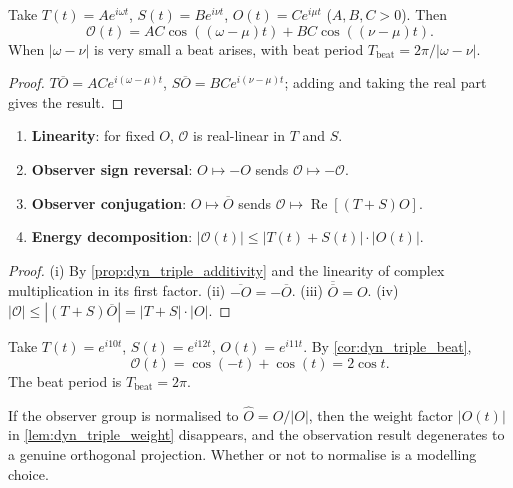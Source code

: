 \begin{corollary}\label{cor:dyn_triple_beat}
Take $T(t)=A e^{i\omega t}$, $S(t)=B e^{i\nu t}$, $O(t)=C e^{i\mu t}$ ($A,B,C>0$). Then
\[
\mathcal O(t)=AC\cos((\omega-\mu)t)+BC\cos((\nu-\mu)t).
\]
When $|\omega-\nu|$ is very small a beat arises, with beat period $T_{\text{beat}}=2\pi/|\omega-\nu|$.
\end{corollary}

\begin{proof}
$T\overline O=AC e^{i(\omega-\mu)t}$, $S\overline O=BC e^{i(\nu-\mu)t}$; adding and taking the real part gives the result.
\end{proof}

\begin{property}\label{prop:dyn_triple_properties}
\begin{enumerate}[label=(\roman*)]
    \item \textbf{Linearity}: for fixed $O$, $\mathcal O$ is real-linear in $T$ and $S$.
    \item \textbf{Observer sign reversal}: $O\mapsto-O$ sends $\mathcal O\mapsto-\mathcal O$.
    \item \textbf{Observer conjugation}: $O\mapsto\overline O$ sends $\mathcal O\mapsto\operatorname{Re}[(T+S)O]$.
    \item \textbf{Energy decomposition}: $|\mathcal O(t)|\le|T(t)+S(t)|\cdot|O(t)|$.
\end{enumerate}
\end{property}

\begin{proof}
(i) By \cref{prop:dyn_triple_additivity} and the linearity of complex multiplication in its first factor. (ii) $\overline{-O}=-\overline O$. (iii) $\overline{\overline O}=O$. (iv) $|\mathcal O|\le|(T+S)\overline O|=|T+S|\cdot|O|$.
\end{proof}

\begin{example}\label{ex:dyn_triple_beat_example}
Take $T(t)=e^{i10t}$, $S(t)=e^{i12t}$, $O(t)=e^{i11t}$. By \cref{cor:dyn_triple_beat},
\[
\mathcal O(t)=\cos(-t)+\cos(t)=2\cos t.
\]
The beat period is $T_{\text{beat}}=2\pi$.
\end{example}

\begin{remark}\label{rem:dyn_triple_normalisation}
If the observer group is normalised to $\widehat O=O/|O|$, then the weight factor $|O(t)|$ in \cref{lem:dyn_triple_weight} disappears, and the observation result degenerates to a genuine orthogonal projection. Whether or not to normalise is a modelling choice.
\end{remark}

